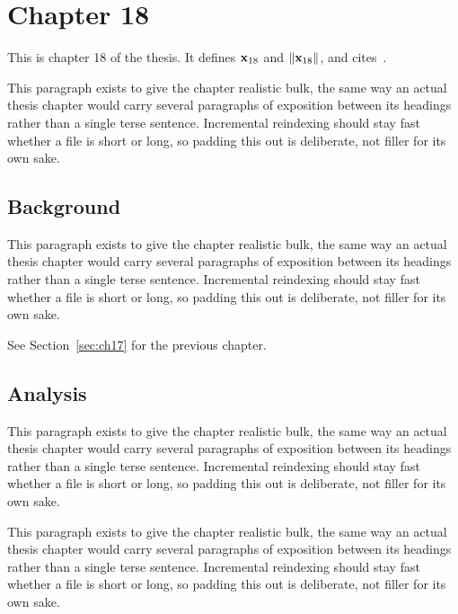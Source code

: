 \section{Chapter 18}
\label{sec:ch18}

This is chapter 18 of the thesis. It defines $\mathbf{x}_{18}$ and $\lVert \mathbf{x}_{18} \rVert$, and cites~\cite{ref1}.

This paragraph exists to give the chapter realistic bulk, the same way an actual thesis chapter would carry several paragraphs of exposition between its headings rather than a single terse sentence. Incremental reindexing should stay fast whether a file is short or long, so padding this out is deliberate, not filler for its own sake.

\subsection{Background}
\label{sec:ch18:background}

This paragraph exists to give the chapter realistic bulk, the same way an actual thesis chapter would carry several paragraphs of exposition between its headings rather than a single terse sentence. Incremental reindexing should stay fast whether a file is short or long, so padding this out is deliberate, not filler for its own sake.

See Section~\ref{sec:ch17} for the previous chapter.

\subsection{Analysis}
\label{sec:ch18:analysis}

This paragraph exists to give the chapter realistic bulk, the same way an actual thesis chapter would carry several paragraphs of exposition between its headings rather than a single terse sentence. Incremental reindexing should stay fast whether a file is short or long, so padding this out is deliberate, not filler for its own sake.

This paragraph exists to give the chapter realistic bulk, the same way an actual thesis chapter would carry several paragraphs of exposition between its headings rather than a single terse sentence. Incremental reindexing should stay fast whether a file is short or long, so padding this out is deliberate, not filler for its own sake.

